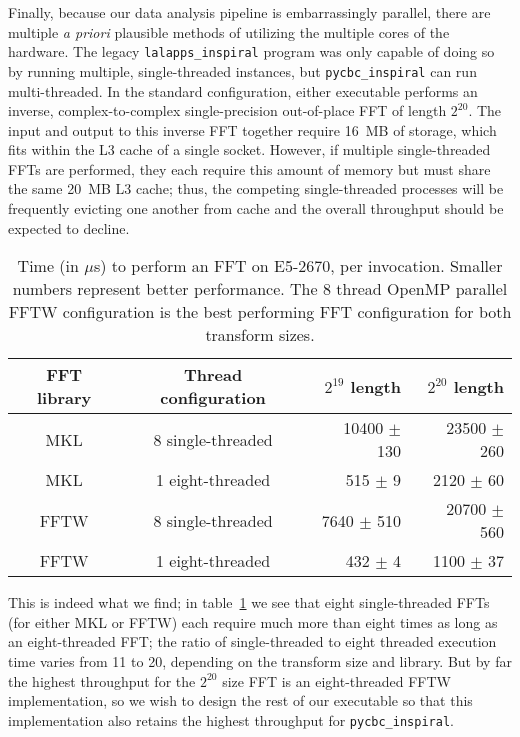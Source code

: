 Finally, because our data analysis pipeline is embarrassingly parallel, there
are multiple \textit{a priori} plausible methods of utilizing the multiple cores
of the hardware. The legacy \texttt{lalapps\_inspiral} program was only capable
of doing so by running multiple, single-threaded instances, but
\texttt{pycbc\_inspiral} can run multi-threaded. In the standard configuration,
either executable performs an inverse, complex-to-complex single-precision
out-of-place FFT of length $2^{20}$. The input and output to this inverse FFT
together require 16~MB of storage, which fits within the L3 cache of a single
socket. However, if multiple single-threaded FFTs are performed, they each
require this amount of memory but must share the same 20~MB L3 cache; thus, the
competing single-threaded processes will be frequently evicting one another from
cache and the overall throughput should be expected to decline.

\begin{table}
  \centering
  \begin{tabular}{|c|c|r|r|}\hline
   \textbf{FFT library} & \textbf{Thread configuration}& \textbf{$2^{19}$ length}& \textbf{$2^{20}$ length} \\ \hline
    MKL & 8 single-threaded & 10400 $\pm$ 130 & 23500 $\pm$ 260  \\ \hline
    MKL & 1 eight-threaded & 515 $\pm$ 9  & 2120 $\pm$ 60   \\ \hline
    FFTW & 8 single-threaded & 7640 $\pm$ 510 & 20700 $\pm$ 560 \\ \hline
    FFTW & 1 eight-threaded &  432 $\pm$ 4 & 1100 $\pm$ 37   \\ \hline
  \end{tabular}
  \caption{Time (in $\mu$s) to perform an FFT on E5-2670, per invocation. Smaller
numbers represent better performance. The 8 thread OpenMP parallel FFTW configuration is
the best performing FFT configuration for both transform sizes.}
  \label{tab:fft}
\end{table}

This is indeed what we find; in table~\ref{tab:fft} we see that eight
single-threaded FFTs (for either MKL or FFTW) each require much more than eight
times as long as an eight-threaded FFT; the ratio of single-threaded to eight
threaded execution time varies from 11 to 20, depending on the transform size and
library. But by far the highest throughput for the $2^{20}$ size FFT is an
eight-threaded FFTW implementation, so we wish to design the rest of our
executable so that this implementation also retains the highest throughput for
\texttt{pycbc\_inspiral}. 

